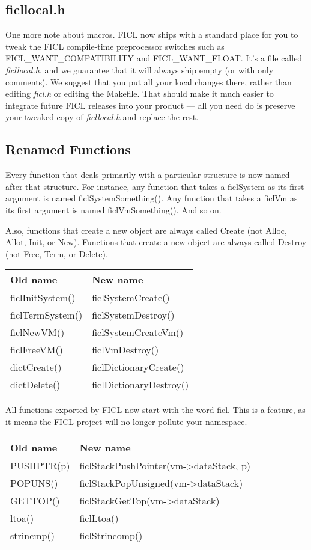 \subsection{ficllocal.h}
One more note about macros. FICL now ships with a standard place for you
to tweak the FICL compile-time preprocessor switches such as
FICL\_WANT\_COMPATIBILITY and FICL\_WANT\_FLOAT. It's a file called
\textit{ficllocal.h}, and we guarantee that it will always ship empty
(or with only comments). We suggest that you put all your local changes
there, rather than editing \textit{ficl.h} or editing the Makefile.
That should make it much easier to integrate future FICL releases into
your product — all you need do is preserve your tweaked copy of
\textit{ficllocal.h} and replace the rest.


\subsection{Renamed Functions}
Every function that deals primarily with a particular structure is now
named after that structure. For instance, any function that takes a
ficlSystem as its first argument is named ficlSystemSomething(). Any
function that takes a ficlVm as its first argument is named
ficlVmSomething(). And so on.

Also, functions that create a new object are always called Create
(not Alloc, Allot, Init, or New). Functions that create a new object
are always called Destroy (not Free, Term, or Delete).

\begin{tabular}{| l | l |}
	\hline
	\textbf{Old name} & \textbf{New name} \\ \hline
	ficlInitSystem() & ficlSystemCreate() \\ \hline
	ficlTermSystem() & ficlSystemDestroy() \\ \hline
	ficlNewVM() & ficlSystemCreateVm() \\ \hline
	ficlFreeVM() & ficlVmDestroy() \\ \hline
	dictCreate() & ficlDictionaryCreate() \\ \hline
	dictDelete() & ficlDictionaryDestroy() \\ \hline
\end{tabular}
All functions exported by FICL now start with the word ficl. This is a
feature, as it means the FICL project will no longer pollute your
namespace.

\begin{tabular}{| l | l |}
	\hline
	\textbf{Old name} & \textbf{New name} \\ \hline
	PUSHPTR(p) & ficlStackPushPointer(vm-\textgreater dataStack, p) \\ \hline
	POPUNS() & ficlStackPopUnsigned(vm-\textgreater dataStack) \\ \hline
	GETTOP() & ficlStackGetTop(vm-\textgreater dataStack) \\ \hline
	ltoa() & ficlLtoa() \\ \hline
	strincmp() & ficlStrincomp() \\ \hline
\end{tabular}



